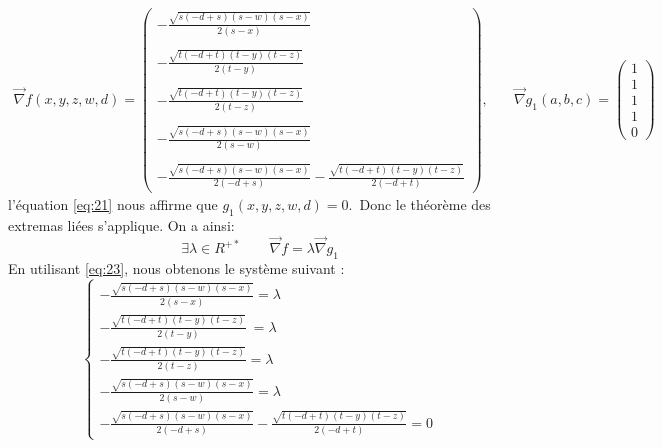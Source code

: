 \documentclass[12pt]{report}
\begin{document}
\begin{align*}
\overrightarrow{\nabla}f(x,y,z,w,d) = 
\left(\begin{matrix}
- \frac{\sqrt{s \left(- d + s\right) \left(s - w\right) \left(s - x\right)}}{2 \left(s - x\right)}\\ \\
- \frac{\sqrt{t \left(- d + t\right) \left(t - y\right) \left(t - z\right)}}{2 \left(t - y\right)}\\ \\
- \frac{\sqrt{t \left(- d + t\right) \left(t - y\right) \left(t - z\right)}}{2 \left(t - z\right)} \\ \\
- \frac{\sqrt{s \left(- d + s\right) \left(s - w\right) \left(s - x\right)}}{2 \left(s - w\right)}\\ \\
- \frac{\sqrt{s \left(- d + s\right) \left(s - w\right) \left(s - x\right)}}{2 \left(- d + s\right)} - \frac{\sqrt{t \left(- d + t\right) \left(t - y\right) \left(t - z\right)}}{2 \left(- d + t\right)}
\end{matrix}\right),\quad          &  \overrightarrow{\nabla}g_{1}(a,b,c) = 
\left(\begin{matrix}
1 \\ 
1 \\ 
1 \\ 
1\\
0
\end{matrix}\right)      
\end{align*}
l'équation \eqref{eq:21} nous affirme que $ g_{1}(x,y,z,w,d)=0$.\ Donc le théorème des extremas liées s'applique. On a ainsi:
\begin{equation}\label{eq:23}
   \exists\lambda\in R^{+*} \quad \quad \overrightarrow{\nabla}f = \lambda \overrightarrow{\nabla}g_{1}
\end{equation}
En utilisant \eqref{eq:23}, nous obtenons le système suivant :
\begin{equation}
\begin{cases} - \frac{\sqrt{s \left(- d + s\right) \left(s - w\right) \left(s - x\right)}}{2 \left(s - x\right)} = \lambda \\
- \frac{\sqrt{t \left(- d + t\right) \left(t - y\right) \left(t - z\right)}}{2 \left(t - y\right)}\ = \lambda  \\
- \frac{\sqrt{t \left(- d + t\right) \left(t - y\right) \left(t - z\right)}}{2 \left(t - z\right)} = \lambda \\
- \frac{\sqrt{s \left(- d + s\right) \left(s - w\right) \left(s - x\right)}}{2 \left(s - w\right)} = \lambda \\
- \frac{\sqrt{s \left(- d + s\right) \left(s - w\right) \left(s - x\right)}}{2 \left(- d + s\right)} - \frac{\sqrt{t \left(- d + t\right) \left(t - y\right) \left(t - z\right)}}{2 \left(- d + t\right)} = 0 
 \end{cases}
\end{equation}
\end{document}
